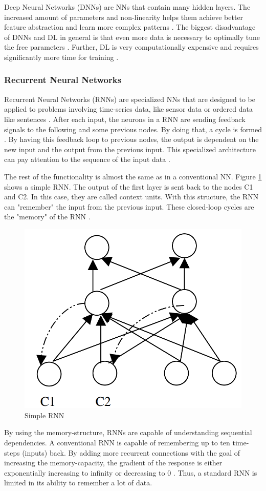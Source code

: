 Deep Neural Networks (DNNs) are NNs that contain many hidden layers. The increased amount of parameters and non-linearity helps them achieve better feature abstraction and learn more complex patterns \cite{JOOST}.
The biggest disadvantage of DNNs and DL in general is that even more data is necessary to optimally tune the free parameters \cite{Thompson}. Further, DL is very computationally expensive and requires significantly more time for training \cite{Fu}. 





\subsubsection*{Recurrent Neural Networks}
Recurrent Neural Networks (RNNs) are specialized NNs that are designed to be applied to problems involving time-series data, like sensor data or ordered data like sentences \cite{Jain}. After each input, the neurons in a RNN are sending feedback signals to the following and some previous nodes. By doing that, a cycle is formed \cite{Grossberg}. By having this feedback loop to previous nodes, the output is dependent on the new input and the output from the previous input. This specialized architecture can pay attention to the sequence of the input data \cite{Jain}.

The rest of the functionality is almost the same as in a conventional NN. Figure \ref{fig:rnn} shows a simple RNN. The output of the first layer is sent back to the nodes C1 and C2. In this case, they are called context units. With this structure, the RNN can "remember" the input from the previous input. These closed-loop cycles are the "memory" of the RNN \cite{Salehinejad}.

\begin{figure}[H]
	\centering
	\includegraphics[width=0.4\linewidth]{IMGs/rnn.png}
	\caption{Simple RNN \cite{Jain}}
	\label{fig:rnn}
\end{figure}

By using the memory-structure, RNNs are capable of understanding sequential dependencies. A conventional RNN is capable of remembering up to ten time-steps (inputs) back. By adding more recurrent connections with the goal of increasing the memory-capacity, the gradient of the response is either exponentially increasing to infinity or decreasing to 0 \cite{Staudemeyer}. Thus, a standard RNN is limited in its ability to remember a lot of data.

